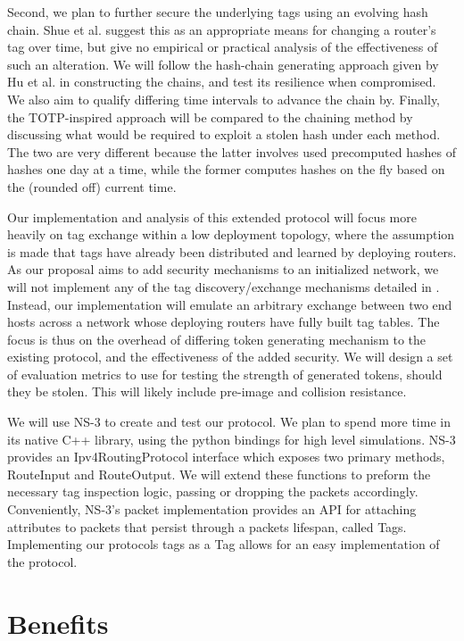 \documentclass[12pt]{article} %
\begin{document}
	Second, we plan to further secure the underlying tags using an evolving hash chain. Shue et al. suggest this as an appropriate means for changing a router's tag over time, but give no empirical or practical analysis of the effectiveness of such an alteration. We will follow the hash-chain generating approach given by Hu et al. \cite{Hu} in constructing the chains, and test its resilience when compromised. We also aim to qualify differing time intervals to advance the chain by. Finally, the TOTP-inspired approach will be compared to the chaining method by discussing what would be required to exploit a stolen hash under each method. The two are very different because the latter involves used precomputed hashes of hashes one day at a time, while the former computes hashes on the fly based on the (rounded off) current time.

	Our implementation and analysis of this extended protocol will focus more heavily on tag exchange within a low deployment topology, where the assumption is made that tags have already been distributed and learned by deploying routers. As our proposal aims to add security mechanisms to an initialized network, we will not implement any of the tag discovery/exchange mechanisms detailed in \cite{Shue20081567}. Instead, our implementation will emulate an arbitrary exchange between two end hosts across a network whose deploying routers have fully built tag tables. The focus is thus on the overhead of differing token generating mechanism to the existing protocol, and the effectiveness of the added security. We will design a set of evaluation metrics to use for testing the strength of generated tokens, should they be stolen. This will likely include pre-image and collision resistance.

	We will use NS-3 to create and test our protocol. We plan to spend more time in its native C++ library, using the python bindings for high level simulations. NS-3 provides an Ipv4RoutingProtocol interface which exposes two primary methods, RouteInput and RouteOutput. We will extend these functions to preform the necessary tag inspection logic, passing or dropping the packets accordingly. Conveniently, NS-3's packet implementation provides an API for attaching attributes to packets that persist through a packets lifespan, called Tags. Implementing our protocols tags as a Tag allows for an easy implementation of the protocol.

\section{Benefits}
\end{document}
